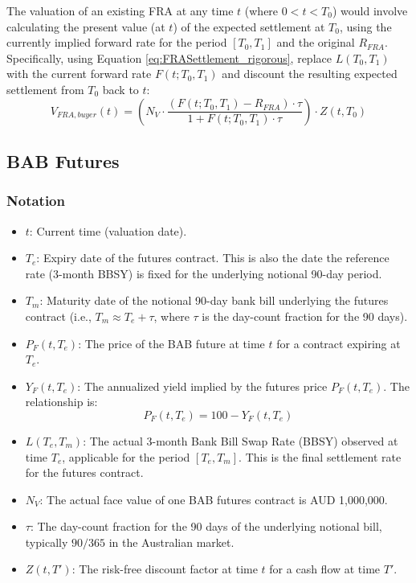 \documentclass[11pt, a4paper, british]{article}
\begin{document}
The valuation of an existing FRA at any time $t$ (where $0 < t < T_0$) would involve calculating the present value (at $t$) of the expected settlement at $T_0$, using the currently implied forward rate for the period $[T_0, T_1]$ and the original $R_{FRA}$. Specifically, using Equation \ref{eq:FRASettlement_rigorous}, replace $L(T_0,T_1)$ with the current forward rate $F(t; T_0, T_1)$ and discount the resulting expected settlement from $T_0$ back to $t$:
\begin{equation}
 V_{FRA, buyer}(t) = \left( N_V \cdot \frac{(F(t; T_0, T_1) - R_{FRA}) \cdot \tau}{1 + F(t; T_0, T_1) \cdot \tau} \right) \cdot Z(t, T_0)
 \label{eq:fra_valuation_t_rigorous}
\end{equation}

\newpage

\subsection{BAB Futures}

\subsubsection{Notation}
\begin{itemize}
 \item $t$: Current time (valuation date).
 \item $T_e$: Expiry date of the futures contract. This is also the date the reference rate (3-month BBSY) is fixed for the underlying notional 90-day period.
 \item $T_m$: Maturity date of the notional 90-day bank bill underlying the futures contract (i.e., $T_m \approx T_e + \tau$, where $\tau$ is the day-count fraction for the 90 days).
 \item $P_F(t, T_e)$: The price of the BAB future at time $t$ for a contract expiring at $T_e$.
 \item $Y_F(t, T_e)$: The annualized yield implied by the futures price $P_F(t, T_e)$. The relationship is:
 \begin{equation}
 P_F(t, T_e) = 100 - Y_F(t, T_e)
 \end{equation}
 \item $L(T_e, T_m)$: The actual 3-month Bank Bill Swap Rate (BBSY) observed at time $T_e$, applicable for the period $[T_e, T_m]$. This is the final settlement rate for the futures contract.
 \item $N_V$: The actual face value of one BAB futures contract is AUD 1,000,000.
 \item $\tau$: The day-count fraction for the 90 days of the underlying notional bill, typically $90/365$ in the Australian market.
 \item $Z(t, T')$: The risk-free discount factor at time $t$ for a cash flow at time $T'$.
\end{itemize}
\end{document}
